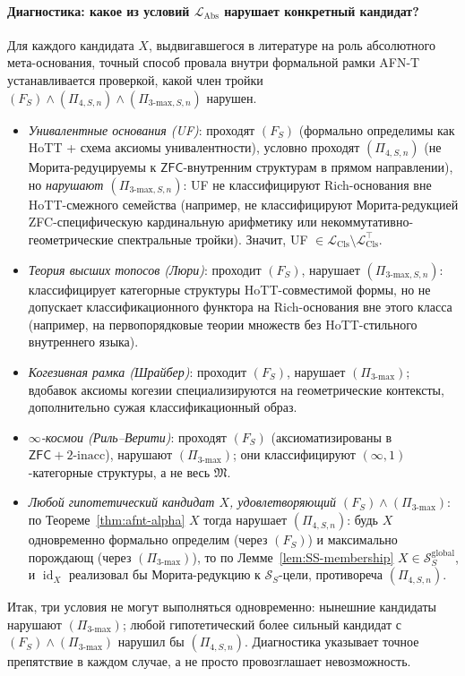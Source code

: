 \documentclass[11pt]{article}
\theoremstyle{plain}
\theoremstyle{definition}
\newcommand{\cS}{\mathcal{S}}
\newcommand{\fM}{\mathfrak{M}}
\newcommand{\LCls}{\mathcal{L}_{\mathrm{Cls}}}
\newcommand{\LClsMax}{\mathcal{L}_{\mathrm{Cls}}^{\top}}
\newcommand{\LAbs}{\mathcal{L}_{\mathrm{Abs}}}
\newcommand{\ZFC}{\mathsf{ZFC}}
\DeclareMathOperator{\id}{id}
\begin{document}
\paragraph{Диагностика: какое из условий $\LAbs$ нарушает конкретный кандидат?} Для каждого кандидата $X$, выдвигавшегося в литературе на роль абсолютного мета-основания, точный способ провала внутри формальной рамки AFN-T устанавливается проверкой, какой член тройки $(F_S) \wedge (\Pi_{4, S, n}) \wedge (\Pi_{3\text{-max}, S, n})$ нарушен.
\begin{itemize}\setlength{\itemsep}{1pt}
\item \emph{Унивалентные основания (UF)}: проходят $(F_S)$ (формально определимы как HoTT + схема аксиомы унивалентности), условно проходят $(\Pi_{4, S, n})$ (не Морита-редуцируемы к $\ZFC$-внутренним структурам в прямом направлении), но \emph{нарушают $(\Pi_{3\text{-max}, S, n})$}: UF не классифицируют Rich-основания вне HoTT-смежного семейства (например, не классифицируют Морита-редукцией ZFC-специфическую кардинальную арифметику или некоммутативно-геометрические спектральные тройки). Значит, UF $\in \LCls \setminus \LClsMax$.
\item \emph{Теория высших топосов (Люри)}: проходит $(F_S)$, нарушает $(\Pi_{3\text{-max}, S, n})$: классифицирует категорные структуры HoTT-совместимой формы, но не допускает классификационного функтора на Rich-основания вне этого класса (например, на первопорядковые теории множеств без HoTT-стильного внутреннего языка).
\item \emph{Когезивная рамка (Шрайбер)}: проходит $(F_S)$, нарушает $(\Pi_{3\text{-max}})$; вдобавок аксиомы когезии специализируются на геометрические контексты, дополнительно сужая классификационный образ.
\item \emph{$\infty$-космои (Риль--Верити)}: проходят $(F_S)$ (аксиоматизированы в $\ZFC + 2\text{-inacc}$), нарушают $(\Pi_{3\text{-max}})$; они классифицируют $(\infty, 1)$-категорные структуры, а не весь $\fM$.
\item \emph{Любой гипотетический кандидат $X$, удовлетворяющий $(F_S) \wedge (\Pi_{3\text{-max}})$}: по Теореме~\ref{thm:afnt-alpha} $X$ тогда нарушает $(\Pi_{4, S, n})$: будь $X$ одновременно формально определим (через $(F_S)$) и максимально порождающ (через $(\Pi_{3\text{-max}})$), то по Лемме~\ref{lem:SS-membership} $X \in \cS_S^{\mathrm{global}}$, и $\id_X$ реализовал бы Морита-редукцию к $\cS_S$-цели, противореча $(\Pi_{4, S, n})$.
\end{itemize}
Итак, три условия не могут выполняться одновременно: нынешние кандидаты нарушают $(\Pi_{3\text{-max}})$; любой гипотетический более сильный кандидат с $(F_S) \wedge (\Pi_{3\text{-max}})$ нарушил бы $(\Pi_{4, S, n})$. Диагностика указывает точное препятствие в каждом случае, а не просто провозглашает невозможность.
\end{document}
